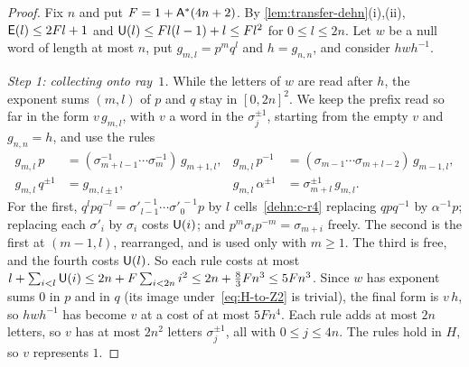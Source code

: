 \begin{proof}
Fix $n$ and put $F=1+\mathsf A^*(4n+2)$. By \cref{lem:transfer-dehn}(i),(ii), $\mathsf E(l)\le2Fl+1$ and $\mathsf U(l)\le Fl(l-1)+l\le Fl^2$ for
$0\le l\le2n$. Let $w$ be a null word of length at most $n$, put $g_{m,l}=p^mq^l$ and $h=g_{n,n}$, and consider $hwh^{-1}$.

\emph{Step 1: collecting onto ray~$1$.} While the letters of $w$ are read after $h$, the exponent sums $(m,l)$ of $p$ and $q$ stay in
$[0,2n]^2$. We keep the prefix read so far in the form $v\,g_{m,l}$, with $v$ a word in the $\sigma_j^{\pm1}$, starting from the empty $v$
and $g_{n,n}=h$, and use the rules
\begin{align*}
g_{m,l}\,p&=(\sigma_{m+l-1}^{-1}\cdots\sigma_m^{-1})\,g_{m+1,l}, & g_{m,l}\,p^{-1}&=(\sigma_{m-1}\cdots\sigma_{m+l-2})\,g_{m-1,l},\\
g_{m,l}\,q^{\pm1}&=g_{m,l\pm1}, & g_{m,l}\,\alpha^{\pm1}&=\sigma_{m+l}^{\pm1}\,g_{m,l}.
\end{align*}
For the first, $q^lpq^{-l}=\sigma'^{\,-1}_{l-1}\cdots\sigma'^{\,-1}_0p$ by $l$ cells~\ref{dehn:c-r4} replacing $qpq^{-1}$ by $\alpha^{-1}p$;
replacing each $\sigma'_i$ by $\sigma_i$ costs $\mathsf U(i)$; and $p^m\sigma_ip^{-m}=\sigma_{m+i}$ freely. The second is the first at
$(m-1,l)$, rearranged, and is used only with $m\ge1$. The third is free, and the fourth costs $\mathsf U(l)$. So each rule costs at most
$l+\sum_{i<l}\mathsf U(i)\le2n+F\sum_{i<2n}i^2\le2n+\frac83Fn^3\le5Fn^3$. Since $w$ has exponent sums $0$ in $p$ and in $q$ (its image
under~\eqref{eq:H-to-Z2} is trivial), the final form is $v\,h$, so $hwh^{-1}$ has become $v$ at a cost of at most $5Fn^4$. Each rule adds at
most $2n$ letters, so $v$ has at most $2n^2$ letters $\sigma_j^{\pm1}$, all with $0\le j\le4n$. The rules hold in $H$, so $v$ represents $1$.


\end{proof}
